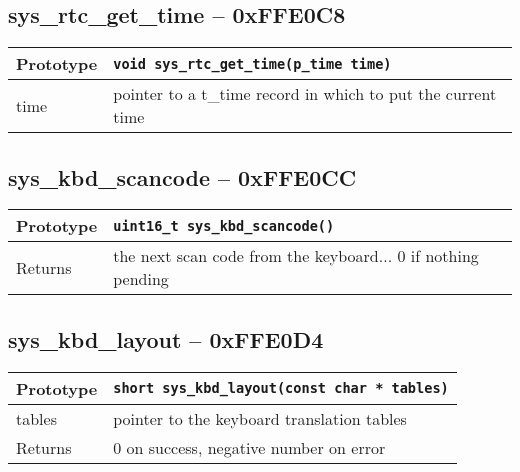 \subsection*{sys\_rtc\_get\_time -- 0xFFE0C8}
\begin{tabular}{|l||l|} \hline
Prototype & \lstinline!void sys_rtc_get_time(p_time time)! \\ \hline
time & pointer to a t\_time record in which to put the current time \\ \hline
\end{tabular}

\subsection*{sys\_kbd\_scancode -- 0xFFE0CC}
\begin{tabular}{|l||l|} \hline
Prototype & \lstinline!uint16_t sys_kbd_scancode()! \\ \hline
Returns & the next scan code from the keyboard... 0 if nothing pending \\ \hline
\end{tabular}

\subsection*{sys\_kbd\_layout -- 0xFFE0D4}
\begin{tabular}{|l||l|} \hline
Prototype & \lstinline!short sys_kbd_layout(const char * tables)! \\ \hline
tables & pointer to the keyboard translation tables \\ \hline
Returns & 0 on success, negative number on error \\ \hline
\end{tabular}
